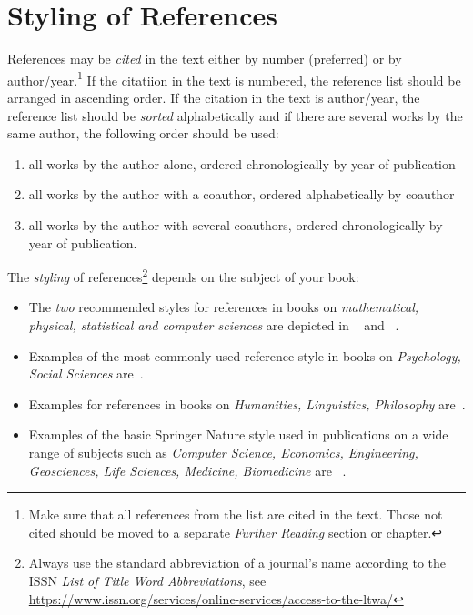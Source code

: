 %
% 
% 
%
\section{Styling of References}
References may be \textit{cited} in the text either by number (preferred) or by author/year.\footnote{Make sure that all references from the list are cited in the text. Those not cited should be moved to a separate \textit{Further Reading} section or chapter.} If the citatiion in the text is numbered, the reference list should be arranged in ascending order. If the citation in the text is author/year, the reference list should be \textit{sorted} alphabetically and if there are several works by the same author, the following order should be used:
\begin{enumerate}
\item all works by the author alone, ordered chronologically by year of publication
\item all works by the author with a coauthor, ordered alphabetically by coauthor
\item all works by the author with several coauthors, ordered chronologically by year of publication.
\end{enumerate}
The \textit{styling} of references\footnote{Always use the standard abbreviation of a journal's name according to the ISSN \textit{List of Title Word Abbreviations}, see \url{https://www.issn.org/services/online-services/access-to-the-ltwa/}} depends on the subject of your book:
\begin{itemize}
\item The \textit{two} recommended styles for references in books on \textit{mathematical, physical, statistical and computer sciences} are depicted in ~\cite{science-contrib, science-online, science-mono, science-journal, science-DOI} and ~\cite{phys-online, phys-mono, phys-journal, phys-DOI, phys-contrib}.
\item Examples of the most commonly used reference style in books on \textit{Psychology, Social Sciences} are~\cite{psysoc-mono, psysoc-online,psysoc-journal, psysoc-contrib, psysoc-DOI}.
\item Examples for references in books on \textit{Humanities, Linguistics, Philosophy} are~\cite{humlinphil-journal, humlinphil-contrib, humlinphil-mono, humlinphil-online, humlinphil-DOI}.
\item Examples of the basic Springer Nature style used in publications on a wide range of subjects such as \textit{Computer Science, Economics, Engineering, Geosciences, Life Sciences, Medicine, Biomedicine} are ~\cite{basic-contrib, basic-online, basic-journal, basic-DOI, basic-mono}. 
\end{itemize}

